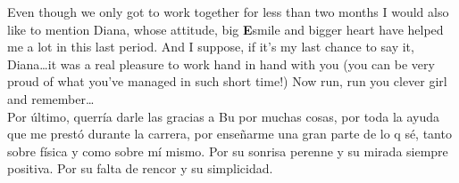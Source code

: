 Even though we only got to work together for less than two months I would also like to mention Diana, whose attitude, big \textbf{E}smile and bigger heart have helped me a lot in this last period.
And I suppose, if it's my last chance to say it, Diana\dots it was a real pleasure to work hand in hand with you (you can be very proud of what you've managed in such short time!) Now run, run you clever girl and remember\dots\\



Por último, querría darle las gracias a Bu por muchas cosas, por toda la ayuda que me prestó durante la carrera, por enseñarme una gran parte de lo q sé, tanto sobre física y como sobre mí mismo. Por su sonrisa perenne y su mirada siempre positiva. Por su falta de rencor y su simplicidad.\\



